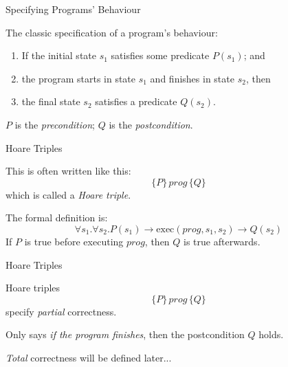 \documentclass[xetex,aspectratio=169,14pt,hyperref={pdfpagelabels=true,pdflang={en-GB}}]{beamer}
\begin{document}

\begin{frame}
  {Specifying Programs' Behaviour}

  The classic specification of a program's behaviour:

  \bigskip

  \begin{enumerate}
  \item If the initial state $s_1$ satisfies some predicate $P(s_1)$; and
  \item the program starts in state $s_1$ and finishes in state $s_2$, then
  \item the final state $s_2$ satisfies a predicate $Q(s_2)$.
  \end{enumerate}

  \bigskip

  $P$ is the \emph{precondition}; $Q$ is the \emph{postcondition}.
\end{frame}

\begin{frame}
  {Hoare Triples}

  This is often written like this:
  \begin{displaymath}
    \{ P \}\, \mathit{prog}\, \{ Q \}
  \end{displaymath}
  which is called a \emph{Hoare triple}.

  \bigskip

  The formal definition is:
  \begin{displaymath}
    \forall s_1. \forall s_2. P(s_1) \to \mathrm{exec}(\mathit{prog},s_1,s_2) \to Q(s_2)
  \end{displaymath}
  If $P$ is true before executing $\mathit{prog}$, then $Q$ is true afterwards.
\end{frame}

\begin{frame}
  {Hoare Triples}

  Hoare triples
  \begin{displaymath}
    \{ P \}\, \mathit{prog}\, \{ Q \}
  \end{displaymath}
  specify \emph{partial} correctness.

  \bigskip

  Only says \emph{if the program finishes}, then the postcondition $Q$ holds.

  \bigskip

  \emph{Total} correctness will be defined later...
\end{frame}
\end{document}
